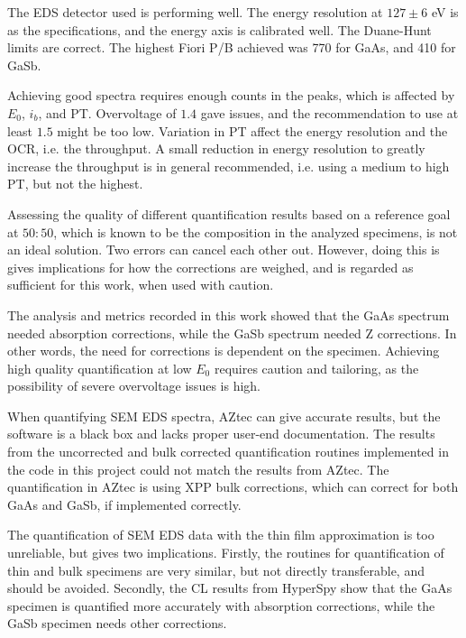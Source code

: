 The EDS detector used is performing well.
The energy resolution at $127 \pm6$ eV is as the specifications, and the energy axis is calibrated well.
The Duane-Hunt limits are correct.
The highest Fiori P/B achieved was 770 for GaAs, and 410 for GaSb.

Achieving good spectra requires enough counts in the peaks, which is affected by $E_0$, $i_b$, and PT.
Overvoltage of $1.4$ gave issues, and the recommendation to use at least $1.5$ might be too low.
Variation in PT affect the energy resolution and the OCR, i.e. the throughput.
A small reduction in energy resolution to greatly increase the throughput is in general recommended, i.e. using a medium to high PT, but not the highest.





Assessing the quality of different quantification results based on a reference goal at $50:50$, which is known to be the composition in the analyzed specimens, is not an ideal solution.
Two errors can cancel each other out.
However, doing this is gives implications for how the corrections are weighed, and is regarded as sufficient for this work, when used with caution.

The analysis and metrics recorded in this work showed that the GaAs spectrum needed absorption corrections, while the GaSb spectrum needed Z corrections.
In other words, the need for corrections is dependent on the specimen.
Achieving high quality quantification at low $E_0$ requires caution and tailoring, as the possibility of severe overvoltage issues is high.

When quantifying SEM EDS spectra, AZtec can give accurate results, but the software is a black box and lacks proper user-end documentation.
The results from the uncorrected and bulk corrected quantification routines implemented in the code in this project could not match the results from AZtec.
The quantification in AZtec is using XPP bulk corrections, which can correct for both GaAs and GaSb, if implemented correctly.

The quantification of SEM EDS data with the thin film approximation is too unreliable, but gives two implications.
Firstly, the routines for quantification of thin and bulk specimens are very similar, but not directly transferable, and should be avoided.
Secondly, the CL results from HyperSpy show that the GaAs specimen is quantified more accurately with absorption corrections, while the GaSb specimen needs other corrections.

